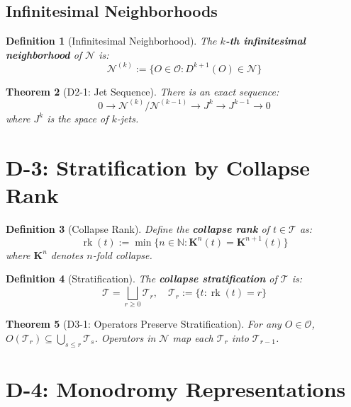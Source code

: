 \documentclass[12pt, oneside]{article}
\newtheorem{theorem}{Theorem}[section]
\newtheorem{definition}[theorem]{Definition}
\newcommand{\K}{\mathbf{K}}
\newcommand{\N}{\mathcal{N}}
\newcommand{\T}{\mathcal{T}}
\newcommand{\Opr}{\mathcal{O}}
\begin{document}
\subsection{Infinitesimal Neighborhoods}

\begin{definition}[Infinitesimal Neighborhood]
The \textbf{$k$-th infinitesimal neighborhood} of $\N$ is:
\begin{equation}
\N^{(k)} := \{ O \in \Opr : D^{k+1}(O) \in \N \}
\end{equation}
\end{definition}

\begin{theorem}[D2-1: Jet Sequence]
There is an exact sequence:
\begin{equation}
0 \rightarrow \N^{(k)}/\N^{(k-1)} \rightarrow J^k \rightarrow J^{k-1} \rightarrow 0
\end{equation}
where $J^k$ is the space of $k$-jets.
\end{theorem}

\section{D-3: Stratification by Collapse Rank}

\begin{definition}[Collapse Rank]
Define the \textbf{collapse rank} of $t \in \T$ as:
\begin{equation}
\operatorname{rk}(t) := \min\{ n \in \mathbb{N} : \K^n(t) = \K^{n+1}(t) \}
\end{equation}
where $\K^n$ denotes $n$-fold collapse.
\end{definition}

\begin{definition}[Stratification]
The \textbf{collapse stratification} of $\T$ is:
\begin{equation}
\T = \bigsqcup_{r \geq 0} \T_r,\quad \T_r := \{ t : \operatorname{rk}(t) = r \}
\end{equation}
\end{definition}

\begin{theorem}[D3-1: Operators Preserve Stratification]
For any $O \in \Opr$, $O(\T_r) \subseteq \bigcup_{s \leq r} \T_s$. Operators in $\N$ map each $\T_r$ into $\T_{r-1}$.
\end{theorem}

\section{D-4: Monodromy Representations}
\end{document}
